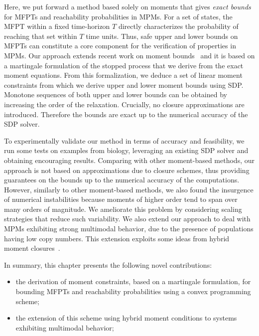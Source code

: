 Here, we put forward a method based solely on moments that gives \emph{exact bounds}  for \acfp{MFPT} and reachability probabilities in \acp{MPM}. For a set of states, the MFPT within a fixed
time-horizon $T$  directly characterizes the probability of reaching that set
within $T$ time units. Thus, safe upper and lower bounds on \acp{MFPT} can constitute a core component for the verification of properties in \acp{MPM}.
Our approach extends recent work on moment
bounds~\cite{sakurai2017convex,dowdy2018dynamic} and it is based on a martingale formulation of the stopped process that we
derive from the exact moment equations. From this formalization, we deduce a set
of linear moment constraints from which we derive
upper and lower moment bounds using \acf{SDP}. Monotone
sequences of both upper and lower bounds
can be obtained by increasing the order of the relaxation. Crucially, no
closure approximations are introduced.
Therefore the bounds are exact up to the numerical accuracy of the \ac{SDP} solver.


To experimentally validate our method in terms of accuracy and feasibility, we run some tests on examples from biology, leveraging an existing \ac{SDP} solver and obtaining encouraging results. 
Comparing with other moment-based methods, our approach is not based on approximations due to closure schemes, thus providing guarantees on the bounds   up to the numerical accuracy of the computations. However, similarly to other moment-based methods, we also found the insurgence of numerical instabilities because moments of higher order tend to span over many orders of magnitude. We ameliorate this problem by considering scaling strategies that reduce such variability. 
We also extend our approach to deal with \acp{MPM} exhibiting strong multimodal behavior, due to the presence of populations having low copy numbers. This extension exploits some ideas from hybrid moment closures~\cite{kazeroonian2014modeling}. 





\noindent
In summary, this chapter presents the following novel contributions:
\begin{itemize}
	\item the derivation of moment constraints, based on a martingale formulation, for bounding \aclp{MFPT}
      and reachability probabilities using a convex programming scheme;
    \item the extension of this scheme using hybrid moment conditions to systems
      exhibiting multimodal behavior;
\end{itemize}

